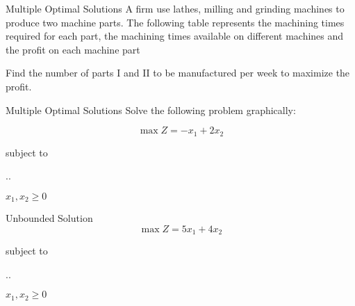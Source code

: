   \begin{frameExample}{Multiple Optimal Solutions\label{example:2.10-01}}{}
    A firm use lathes, milling and grinding machines to produce two machine parts. The following table represents the machining times required for each part, the machining times available on different machines and the profit on each machine part

    {
      \centering
      \par
    }

    Find the number of parts I and II to be manufactured per week to maximize the profit.
  \end{frameExample}


  \begin{frameExample}{Multiple Optimal Solutions}{}
    Solve the following problem graphically:

    \[ \max Z = -x_1 + 2x_2 \]

  {\centering
    subject to

    \sysdelim..

    \vspace{5mm}

    $x_1, x_2 \geq 0$
    \par}
  \end{frameExample}

  \begin{frameExample}{Unbounded Solution}{}
    \[ \max Z = 5x_1 + 4x_2\]

    {\centering
      subject to

      \vspace{3mm}

      \sysdelim..%

      \vspace{3mm}
      $x_1, x_2 \geq 0$
    \par}
  \end{frameExample}

